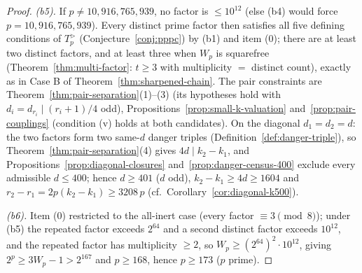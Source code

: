 \documentclass[11pt]{amsart}
\theoremstyle{plain}
\theoremstyle{definition}
\theoremstyle{remark}
\numberwithin{equation}{section}
\begin{document}
\begin{proof}
\emph{(b5).} If $p \neq 10{,}916{,}765{,}939$, no factor is
$\leq 10^{12}$ (else (b4) would force $p = 10{,}916{,}765{,}939$). Every
distinct prime factor then satisfies all five defining conditions of
$T_p^{>}$ (Conjecture~\ref{conj:pppc}) by (b1) and item (0); there are at
least two distinct factors, and at least three when $W_p$ is squarefree
(Theorem~\ref{thm:multi-factor}: $t \geq 3$ with multiplicity $=$
distinct count), exactly as in Case B of
Theorem~\ref{thm:sharpened-chain}. The pair constraints are
Theorem~\ref{thm:pair-separation}(1)--(3) (its hypotheses hold with
$d_i = d_{r_i} \mid (r_i + 1)/4$ odd),
Propositions~\ref{prop:small-k-valuation}
and~\ref{prop:pair-couplings} (condition (v) holds at both candidates).
On the diagonal $d_1 = d_2 = d$: the two factors form two same-$d$
danger triples (Definition~\ref{def:danger-triple}), so
Theorem~\ref{thm:pair-separation}(4) gives $4 d \mid k_2 - k_1$, and
Propositions~\ref{prop:diagonal-closures} and~\ref{prop:danger-census-400}
exclude every admissible
$d \leq 400$; hence $d \geq 401$ ($d$ odd), $k_2 - k_1 \geq 4 d \geq
1604$ and $r_2 - r_1 = 2p(k_2 - k_1) \geq 3208\,p$ (cf.\
Corollary~\ref{cor:diagonal-k500}).

\emph{(b6).} Item (0) restricted to the all-inert case (every factor
$\equiv 3 \pmod 8$); under (b5) the repeated factor exceeds $2^{64}$ and
a second distinct factor exceeds $10^{12}$, and the repeated factor has
multiplicity $\geq 2$, so $W_p \geq (2^{64})^2 \cdot 10^{12}$, giving
$2^p \geq 3 W_p - 1 > 2^{167}$ and $p \geq 168$, hence $p \geq 173$ ($p$
prime).
\end{proof}
\end{document}
